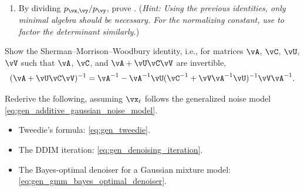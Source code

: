 \documentclass[../../book-main.tex]{subfiles}
\begin{document}
\begin{exercise}
\begin{enumerate}
\begin{align}
\begin{bmatrix}
                    \Zero & \vSigma_{\vy}^{-1}
                \end{bmatrix}
                \begin{bmatrix}
                    \vx - \vm \\
                    \vy - \vmu_{\vy}
                \end{bmatrix},
            \end{align}
            where $\vm = \vmu_{\vx} +
            \vSigma_{\vx\vy}\vSigma_{\vy}^{-1}(\vy
            - \vmu_{\vy})$.
        \item By dividing $p_{\vx, \vy} / p_{\vy}$, prove
            . (\textit{Hint:
                    Using the previous
                    identities, only minimal algebra should
                    be necessary.
                    For the normalizing
                    constant, use
                    to
            factor the determinant similarly.})

    \end{enumerate}

\end{exercise}

\begin{exercise}\label{exercise:sherman_morrison_woodbury_identity}
    Show the Sherman--Morrison--Woodbury identity, i.e., for matrices
    \(\vA\), \(\vC\), \(\vU\), \(\vV\) such that \(\vA\), \(\vC\), and
    \(\vA + \vU\vC\vV\) are invertible,
    \begin{equation}
        (\vA + \vU\vC\vV)^{-1} = \vA^{-1} - \vA^{-1}\vU(\vC^{-1} +
        \vV\vA^{-1}\vU)^{-1}\vV\vA^{-1}.
    \end{equation}
\end{exercise}

\begin{exercise}\label{exercise:generalizing_results_to_different_noise_models}
    Rederive the following, assuming \(\vx_{t}\) follows the generalized
    noise model \eqref{eq:gen_additive_gaussian_noise_model}.
    \begin{itemize}
        \item Tweedie's formula: \eqref{eq:gen_tweedie}.
        \item The DDIM iteration: \eqref{eq:gen_denoising_iteration}.
        \item The Bayes-optimal denoiser for a Gaussian mixture model:
            \eqref{eq:gen_gmm_bayes_optimal_denoiser}.
    \end{itemize}
\end{exercise}
\end{document}

